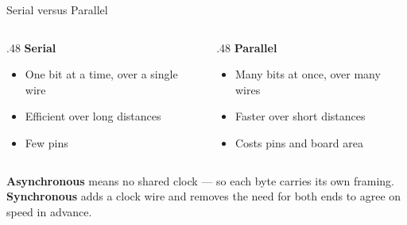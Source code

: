 \documentclass[9pt,aspectratio=169,xcolor=table]{beamer}
\begin{document}
\begin{frame}{Serial versus Parallel}
    \begin{columns}[T]
    \begin{column}{.48\textwidth}
        \textbf{Serial}
        \begin{itemize}
            \item One bit at a time, over a \alert{single} wire
            \item Efficient over \alert{long distances}
            \item Few pins
        \end{itemize}
    \end{column}
    \begin{column}{.48\textwidth}
        \textbf{Parallel}
        \begin{itemize}
            \item Many bits at once, over \alert{many} wires
            \item Faster over \alert{short distances}
            \item Costs pins and board area
        \end{itemize}
    \end{column}
    \end{columns}

    \vspace{3mm}
    \begin{center}
    \end{center}

    \vspace{2mm}
    {\small \textbf{Asynchronous} means no shared clock --- so each byte carries
    its own framing. \textbf{Synchronous} adds a clock wire and removes the need
    for both ends to agree on speed in advance.}
\end{frame}
\end{document}
